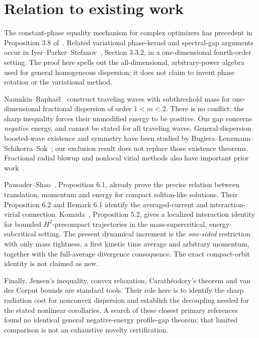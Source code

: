 \documentclass[11pt,a4paper]{article}
\theoremstyle{remark}\newtheorem{remark}[theorem]{Remark}
\begin{document}
\section{Relation to existing work}
The constant-phase equality mechanism for complex optimizers has precedent in Proposition 3.8 of~\cite{FJMM}. Related variational phase-kernel and spectral-gap arguments occur in Iyer--Parker--Stefanov~\cite{IPS}, Section 3.3.2, in a one-dimensional fourth-order setting. The proof here spells out the all-dimensional, arbitrary-power algebra used for general homogeneous dispersion; it does not claim to invent phase rotation or the variational method.

Naumkin--Rapha\"el~\cite{NR} construct traveling waves with subthreshold mass for one-dimensional fractional dispersion of order $1<m<2$. There is no conflict: the sharp inequality forces their unmodified energy to be positive. Our gap concerns \emph{negative} energy, and cannot be stated for all traveling waves. General-dispersion boosted-wave existence and symmetry have been studied by Bugiera--Lenzmann--Schikorra--Sok~\cite{BLSS}; our exclusion result does not replace those existence theorems. Fractional radial blowup and nonlocal virial methods also have important prior work~\cite{BHL}.

Pausader--Shao~\cite{PS}, Proposition 6.1, already prove the precise relation between translation, momentum and energy for compact soliton-like solutions. Their Proposition 6.2 and Remark 6.1 identify the averaged-current and interaction-virial connection. Komada~\cite{Komada}, Proposition 5.2, gives a localized interaction identity for bounded $H^2$-precompact trajectories in the mass-supercritical, energy-subcritical setting. The present dynamical increment is the \emph{one-sided} restriction with only mass tightness, a first kinetic time average and arbitrary momentum, together with the full-average divergence consequence. The exact compact-orbit identity is not claimed as new.

Finally, Jensen's inequality, convex relaxation, Carath\'eodory's theorem and van der Corput bounds are standard tools. Their role here is to identify the sharp radiation cost for nonconvex dispersion and establish the decoupling needed for the stated nonlinear corollaries. A search of these closest primary references found no identical general negative-energy profile-gap theorem; that limited comparison is not an exhaustive novelty certification.
\end{document}

